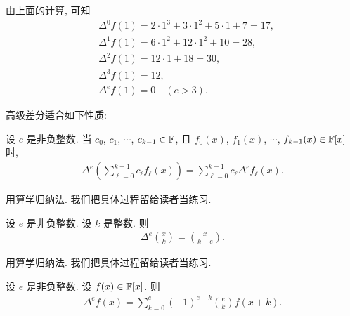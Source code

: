 \begin{example}
    由上面的计算, 可知
    \begin{align*}
         & \Delta^0 f(1) = 2 \cdot 1^3 + 3 \cdot 1^2 + 5 \cdot 1 + 7 = 17, \\
         & \Delta^1 f(1) = 6 \cdot 1^2 + 12 \cdot 1^2 + 10 = 28,           \\
         & \Delta^2 f(1) = 12 \cdot 1 + 18 = 30,                           \\
         & \Delta^3 f(1) = 12,                                             \\
         & \Delta^e f(1) = 0 \quad (e > 3).
    \end{align*}
\end{example}

高级差分适合如下性质:

\begin{proposition}
    设 $e$ 是非负整数. 当 $c_0$, $c_1$, $\cdots$, $c_{k-1} \in \mathbb{F}$, 且 $f_0 (x)$, $f_1 (x)$, $\cdots$, $f_{k-1} (x) \in \mathbb{F}[x]$ 时,
    \begin{align*}
        \Delta^e \left( \sum_{\ell = 0}^{k-1} c_\ell f_\ell (x) \right)
        = \sum_{\ell = 0}^{k-1} c_\ell \Delta^e f_\ell (x).
    \end{align*}
\end{proposition}

\begin{pf}
    用算学归纳法. 我们把具体过程留给读者当练习.
\end{pf}

\begin{proposition}
    设 $e$ 是非负整数. 设 $k$ 是整数. 则
    \begin{align*}
        \Delta^e \binom{x}{k} = \binom{x}{k - e}.
    \end{align*}
\end{proposition}

\begin{pf}
    用算学归纳法. 我们把具体过程留给读者当练习.
\end{pf}

\begin{proposition}
    设 $e$ 是非负整数. 设 $f(x) \in \mathbb{F}[x]$. 则
    \begin{align*}
        \Delta^e f(x) = \sum_{k = 0}^{e} (-1)^{e-k} \binom{e}{k} f(x+k).
    \end{align*}
\end{proposition}

